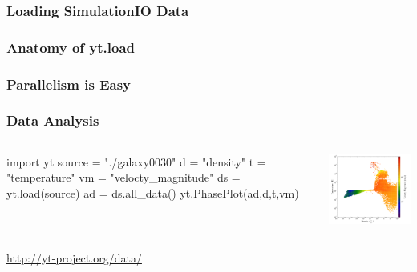 \documentclass[]{beamer}
\begin{document}
\begin{frame}
  \frametitle{Loading SimulationIO Data}
  
\end{frame}

\begin{frame}[fragile]
  \frametitle{Anatomy of yt.load}
\end{frame}

\begin{frame}
  \frametitle{Parallelism is Easy}
  
\end{frame}

\begin{frame}[fragile]
  \frametitle{Data Analysis}
  \begin{columns}
    \column{5cm}
\begin{python}
import yt
source = "./galaxy0030"
d = "density"
t = "temperature"
vm = "velocty_magnitude"
ds = yt.load(source)
ad = ds.all_data()
yt.PhasePlot(ad,d,t,vm)
\end{python}
    \column{7cm}
    \begin{center}
      \includegraphics[width=7cm]{figures/isolated_galaxy_phase_diagram.pdf}
    \end{center}
  \end{columns}
  \begin{flushright}
    {\footnotesize\url{http://yt-project.org/data/}}
  \end{flushright}
\end{frame}
\end{document}
